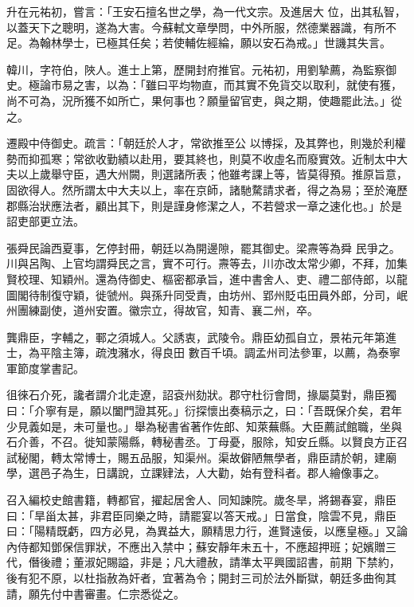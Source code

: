 \begin{pinyinscope}
 升在元祐初，嘗言：「王安石擅名世之學，為一代文宗。及進居大
 位，出其私智，以蓋天下之聰明，遂為大害。今蘇軾文章學問，中外所服，然德業器識，有所不足。為翰林學士，已極其任矣；若使輔佐經綸，願以安石為戒。」世譏其失言。



 韓川，字符伯，陜人。進士上第，歷開封府推官。元祐初，用劉摯薦，為監察御史。極論市易之害，以為：「雖曰平均物直，而其實不免貨交以取利，就使有獲，尚不可為，況所獲不如所亡，果何事也？願量留官吏，與之期，使趣罷此法。」從之。



 遷殿中侍御史。疏言：「朝廷於人才，常欲推至公
 以博採，及其弊也，則幾於利權勢而抑孤寒；常欲收勤績以赴用，要其終也，則莫不收虛名而廢實效。近制太中大夫以上歲舉守臣，遇大州闕，則選諸所表；他雖考課上等，皆莫得預。推原旨意，固欲得人。然所謂太中大夫以上，率在京師，諸馳騖請求者，得之為易；至於淹歷郡縣治狀應法者，顧出其下，則是謹身修潔之人，不若營求一章之速化也。」於是詔吏部更立法。



 張舜民論西夏事，乞停封冊，朝廷以為開邊隙，罷其御史。梁燾等為舜
 民爭之。川與呂陶、上官均謂舜民之言，實不可行。燾等去，川亦改太常少卿，不拜，加集賢校理、知穎州。還為侍御史、樞密都承旨，進中書舍人、吏、禮二部侍郎，以龍圖閣待制復守穎，徙虢州。與孫升同受責，由坊州、郢州貶屯田員外郎，分司，岷州團練副使，道州安置。徽宗立，得故官，知青、襄二州，卒。



 龔鼎臣，字輔之，鄆之須城人。父誘衷，武陵令。鼎臣幼孤自立，景祐元年第進士，為平陰主簿，疏洩瀦水，得良田
 數百千頃。調孟州司法參軍，以薦，為泰寧軍節度掌書記。



 徂徠石介死，讒者謂介北走遼，詔袞州劾狀。郡守杜衍會問，掾屬莫對，鼎臣獨曰：「介寧有是，願以闔門證其死。」衍探懷出奏稿示之，曰：「吾既保介矣，君年少見義如是，未可量也。」舉為秘書省著作佐郎、知萊蕪縣。大臣薦試館職，坐與石介善，不召。徙知蒙陽縣，轉秘書丞。丁母憂，服除，知安丘縣。以賢良方正召試秘閣，轉太常博士，賜五品服，知渠州。渠故僻陋無學者，鼎臣請於朝，建廟
 學，選邑子為生，日講說，立課肄法，人大勸，始有登科者。郡人繪像事之。



 召入編校史館書籍，轉都官，擢起居舍人、同知諫院。歲冬旱，將錫春宴，鼎臣曰：「旱甾太甚，非君臣同樂之時，請罷宴以答天戒。」日當食，陰雲不見，鼎臣曰：「陽精既虧，四方必見，為異益大，願精思力行，進賢遠佞，以應皇極。」又論內侍都知鄧保信罪狀，不應出入禁中；蘇安靜年未五十，不應超押班；妃嬪贈三代，僭後禮；董淑妃賜謚，非是；凡大禮赦，請準太平興國詔書，前期
 下禁約，後有犯不原，以杜指赦為奸者，宜著為令；開封三司於法外斷獄，朝廷多曲徇其請，願先付中書審畫。仁宗悉從之。




\end{pinyinscope}
